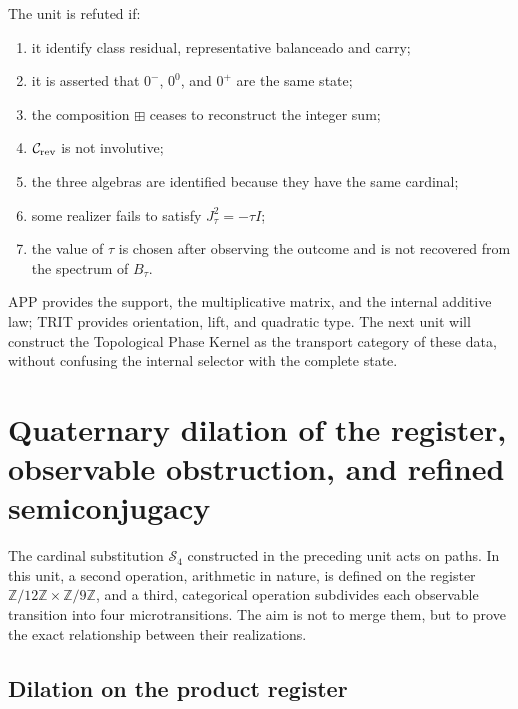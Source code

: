\begin{criterion}
The unit is refuted if:
\begin{enumerate}
 \item it identify class residual, representative balanceado and carry;
 \item it is asserted that \(0^-\), \(0^0\), and \(0^+\) are the same state;
 \item the composition \(\boxplus\) ceases to reconstruct the integer sum;
 \item \(\mathcal C_{\rm rev}\) is not involutive;
 \item the three algebras are identified because they have the same cardinal;
 \item some realizer fails to satisfy \(J_\tau^2=-\tau I\);
 \item the value of \(\tau\) is chosen after observing the outcome and is not
       recovered from the spectrum of \(B_\tau\).
\end{enumerate}
\end{criterion}

APP provides the support, the multiplicative matrix, and the internal additive
law; TRIT provides orientation,
lift, and quadratic type. The next unit will construct the
Topological Phase Kernel as the transport category of these data, without
confusing the internal selector with the complete state.

\HMTDeferredTPKBase
\HMTDeferredTPKDevelopment



\section{Quaternary dilation of the register, observable obstruction, and refined semiconjugacy}
\label{p12-83-c1-s12:chap:dilatacion-cuaternaria-semiconjugacion}

The cardinal substitution \(\mathcal S_4\) constructed in the preceding unit
acts on paths. In this unit, a second operation, arithmetic in
nature, is defined on the register
\(\mathbb Z/12\mathbb Z\times\mathbb Z/9\mathbb Z\), and a third,
categorical operation subdivides each observable transition into four
microtransitions. The aim is not to merge them, but to prove the exact
relationship between their realizations.

\subsection{Dilation on the product register}

